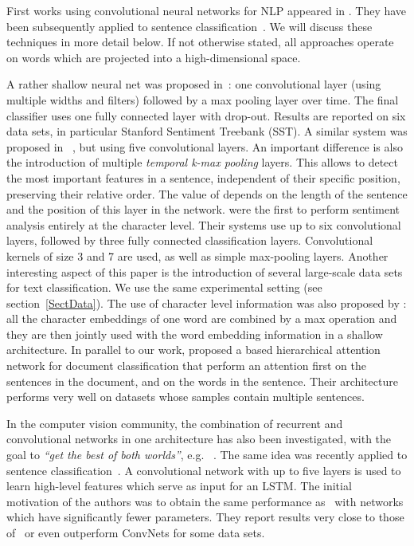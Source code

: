 \documentclass[a4paper,11pt]{article}
\newcommand{\eg}{e.g. }
\begin{document}
First works using convolutional neural networks for NLP appeared in
\cite{collobert:2008:icml_nlp,collobert:2011:jmlt_nlp}.  They have been
subsequently applied to sentence
classification~\cite{Kim:2014_emnlp:text_convnet,Kalchbrenner:2014:convNNMT,Zhang:2015_nips:text_convnet}.
We will discuss these techniques in more detail below.  If not otherwise
stated, all approaches operate on words which are projected into a
high-dimensional space.


A rather shallow neural net was proposed
in~\cite{Kim:2014_emnlp:text_convnet}: one convolutional layer (using
multiple widths and filters) followed by a max pooling layer over time. The
final classifier uses one fully connected layer with drop-out.  Results are
reported on six data sets, in particular Stanford Sentiment Treebank (SST).
A similar system was proposed in ~\cite{Kalchbrenner:2014:convNNMT}, but using
five convolutional layers. An important difference is also the introduction of
multiple \textit{temporal k-max pooling} layers. This allows to detect the  most important
features in a sentence, independent of their specific position, preserving
their relative order. The value of  depends on the length of the sentence
and the position of this layer in the network.
\cite{Zhang:2015_nips:text_convnet} were the first to perform sentiment
analysis entirely at the character level. Their systems use up to six
convolutional layers, followed by three fully connected classification layers.
Convolutional kernels of size 3 and 7 are used, as well as simple max-pooling
layers.  Another interesting aspect of this paper is the introduction of
several large-scale data sets for text classification. We use 
the same experimental setting (see section~\ref{SectData}).
The use of character level information was also proposed by
\cite{Santos:2014_coling:text_convnet}: all the character
embeddings of one word are combined by a max operation and they are then jointly
used with the word embedding information in a shallow architecture. In parallel to our work, \cite{yang2016hierarchical} proposed a based hierarchical attention network for document classification that perform an attention first on the sentences in the document, and on the words in the sentence. Their architecture performs very well on datasets whose samples contain multiple sentences.

In the computer vision community, the combination of recurrent and
convolutional networks in one architecture has also been investigated, with the
goal to \textit{``get the best of both worlds''},
\eg~\cite{Pinhero:2014_icml:conv+rnn}.
The same idea was recently applied to
sentence classification~\cite{Xiao:2016_arxiv:conv+rnn}. A convolutional
network with up to five layers is used to learn high-level features which serve
as input for an LSTM. The initial motivation of the authors was to obtain the
same performance as~\cite{Zhang:2015_nips:text_convnet} with networks which
have significantly fewer parameters. They report results very close to those
of~\cite{Zhang:2015_nips:text_convnet} or even outperform ConvNets for some
data sets.
\end{document}
